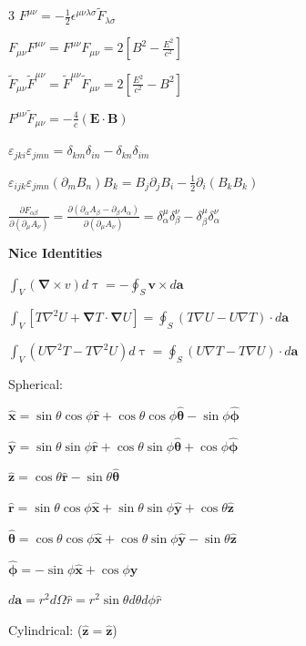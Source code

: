 \documentclass[a4paper,twoside]{article}
\newcommand{\secblock}[1]{%
\par\vspace{1.8pt}%
\noindent\colorbox{hdrcol}{\parbox[c][1.0em][c]{0.98\linewidth}{\color{white}\bfseries\small #1}}\par
\vspace{1pt}%
}
\begin{document}
\begin{multicols*}{3}
\(F^{\mu\nu} = - \frac{1}{2} \epsilon^{\mu\nu\lambda\sigma} \tilde{F}_{\lambda\sigma} \)

\(F_{\mu \nu} F^{\mu \nu} = F^{\mu \nu} F_{\mu \nu}  = 2[ B^2 - \frac{E^2}{c^2} ]\)

\(\tilde{F}_{\mu \nu} \tilde{F}^{\mu \nu} = \tilde{F}^{\mu \nu} \tilde{F}_{\mu \nu}  = 2[ \frac{E^2}{c^2} - B^2]\)

\(F^{\mu \nu } \tilde{F}_{\mu \nu} = -\frac{4}{c}(\bm E \cdot \bm B)\)

\(\varepsilon_{jki}\varepsilon_{jmn} = \delta_{km}\delta_{in} - \delta_{kn}\delta_{im}\)

\(\varepsilon_{ijk}\varepsilon_{jmn}(\partial_m B_n)B_k = B_j\partial_j B_i - \tfrac{1}{2}\partial_i(B_k B_k)\)

\(\frac{\partial F_{\alpha\beta}}{\partial(\partial_\mu A_\nu)} = \frac{\partial(\partial_\alpha A_\beta - \partial_\beta A_\alpha)}{\partial(\partial_\mu A_\nu)} = \delta^\mu_\alpha \delta^\nu_\beta - \delta^\mu_\beta \delta^\nu_\alpha\)



\secblock{Nice Identities}
\(\int_V (\bm \nabla \times v) d \uptau = - \oint_S \bm v \times d \bm a\)

\(\int_V [T \nabla^2 U + \bm \nabla T \cdot \bm \nabla U] = \oint_S (T \nabla U - U \nabla T) \cdot d \bm a\)

\(\int_V (U \nabla^2 T - T \nabla^2 U) d \uptau = \oint_S (U \nabla T - T \nabla U) \cdot d \bm a\)

Spherical:

\(\hat{\bm x} = \sin \theta \cos \phi \hat{\bm r} + \cos \theta \cos \phi \hat{\bm \theta}-\sin \phi \hat{\bm \phi}\)

\(\hat{\bm y} = \sin\theta \sin \phi \hat{\bm r} + \cos\theta \sin \phi \hat{\bm \theta} + \cos \phi \hat{\bm \phi}\)

\(\hat{\bm z} = \cos \theta \hat{\bm r} - \sin \theta \hat{\bm \theta}\)

\(\hat{\bm{r}} = \sin\theta \cos \phi \hat{\bm x} + \sin \theta \sin \phi \hat{\bm y}+\cos \theta \hat{\bm z}\)

\(\hat{\bm \theta} = \cos\theta\cos\phi \hat{\bm x} + \cos\theta\sin\phi \hat{\bm y} - \sin\theta \hat{\bm z}\)

\(\hat{\bm \phi} = -\sin\phi \hat{\bm x} + \cos\phi \hat{\bm y}\)

\(d \bm a = r^2 d \Omega \hat{r} = r^2 \sin \theta d\theta d\phi \hat{r}\)

Cylindrical: (\(\hat{\bm z} = \hat{\bm z}\))


\end{multicols*}
\end{document}
